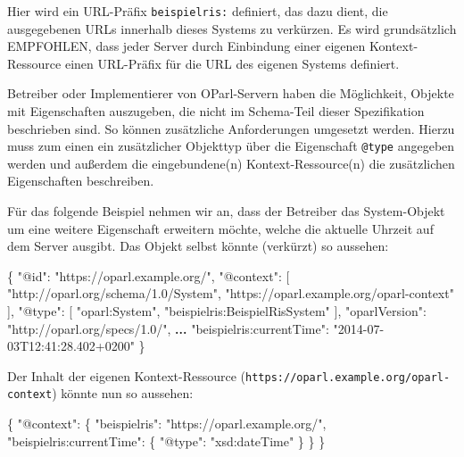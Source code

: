 \documentclass[,a4paper]{article}
\newenvironment{Shaded}{}{}
\newcommand{\DataTypeTok}[1]{\textcolor[rgb]{0.56,0.13,0.00}{{#1}}}
\newcommand{\StringTok}[1]{\textcolor[rgb]{0.25,0.44,0.63}{{#1}}}
\newcommand{\OtherTok}[1]{\textcolor[rgb]{0.00,0.44,0.13}{{#1}}}
\newcommand{\FunctionTok}[1]{\textcolor[rgb]{0.02,0.16,0.49}{{#1}}}
\newcommand{\ErrorTok}[1]{\textcolor[rgb]{1.00,0.00,0.00}{\textbf{{#1}}}}
\begin{document}
Hier wird ein URL-Präfix \texttt{beispielris:} definiert, das dazu
dient, die ausgegebenen URLs innerhalb dieses Systems zu verkürzen. Es
wird grundsätzlich EMPFOHLEN, dass jeder Server durch Einbindung einer
eigenen Kontext-Ressource einen URL-Präfix für die URL des eigenen
Systems definiert.

Betreiber oder Implementierer von OParl-Servern haben die Möglichkeit,
Objekte mit Eigenschaften auszugeben, die nicht im Schema-Teil dieser
Spezifikation beschrieben sind. So können zusätzliche Anforderungen
umgesetzt werden. Hierzu muss zum einen ein zusätzlicher Objekttyp über
die Eigenschaft \texttt{@type} angegeben werden und außerdem die
eingebundene(n) Kontext-Ressource(n) die zusätzlichen Eigenschaften
beschreiben.

Für das folgende Beispiel nehmen wir an, dass der Betreiber das
System-Objekt um eine weitere Eigenschaft erweitern möchte, welche die
aktuelle Uhrzeit auf dem Server ausgibt. Das Objekt selbst könnte
(verkürzt) so aussehen:

\begin{Shaded}
\begin{Highlighting}[]
\FunctionTok{\{}
    \DataTypeTok{"@id"}\FunctionTok{:} \StringTok{"https://oparl.example.org/"}\FunctionTok{,}
    \DataTypeTok{"@context"}\FunctionTok{:} \OtherTok{[}
        \StringTok{"http://oparl.org/schema/1.0/System"}\OtherTok{,}
        \StringTok{"https://oparl.example.org/oparl-context"}
    \OtherTok{]}\FunctionTok{,}
    \DataTypeTok{"@type"}\FunctionTok{:} \OtherTok{[}
        \StringTok{"oparl:System"}\OtherTok{,}
        \StringTok{"beispielris:BeispielRisSystem"}
    \OtherTok{]}\FunctionTok{,}
    \DataTypeTok{"oparlVersion"}\FunctionTok{:} \StringTok{"http://oparl.org/specs/1.0/"}\FunctionTok{,}
    \ErrorTok{...}
    \DataTypeTok{"beispielris:currentTime"}\FunctionTok{:} \StringTok{"2014-07-03T12:41:28.402+0200"}
\FunctionTok{\}}
\end{Highlighting}
\end{Shaded}

Der Inhalt der eigenen Kontext-Ressource
(\texttt{https://oparl.example.org/oparl-context}) könnte nun so
aussehen:

\begin{Shaded}
\begin{Highlighting}[]
\FunctionTok{\{}
    \DataTypeTok{"@context"}\FunctionTok{:} \FunctionTok{\{}
        \DataTypeTok{"beispielris"}\FunctionTok{:} \StringTok{"https://oparl.example.org/"}\FunctionTok{,}
        \DataTypeTok{"beispielris:currentTime"}\FunctionTok{:} \FunctionTok{\{}
            \DataTypeTok{"@type"}\FunctionTok{:} \StringTok{"xsd:dateTime"}
        \FunctionTok{\}}
    \FunctionTok{\}}
\FunctionTok{\}}
\end{Highlighting}
\end{Shaded}
\end{document}
